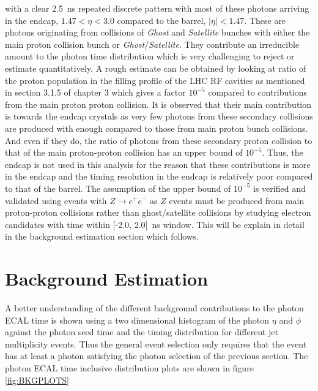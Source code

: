 with a clear 2.5~ns repeated discrete pattern with most of these photons arriving in the endcap, $ 1.47 < \eta < 3.0$ compared to the barrel, $|\eta| < 1.47$. These are photons originating from collisions of \textit{Ghost} and \textit{Satellite} bunches with either the main proton collision bunch or \textit{Ghost}/\textit{Satellite}. They contribute an irreducible amount to the photon time distribution which is very challenging to reject or estimate quantitatively. A rough estimate can be obtained by looking at ratio of the proton population in the filling profile of the LHC RF cavities as mentioned in section 3.1.5 of chapter 3 which gives a factor $10^{-5}$ compared to contributions from the main proton proton collision. It is observed that their main contribution is towards the endcap crystals as very few photons from these secondary collisions are produced with enough \pt compared to those from main proton bunch collisions. And even if they do, the ratio of photons from these secondary proton collision to that of the main proton-proton collision has an upper bound of  $10^{-5}$. 
Thus, the endcap is not used in this analysis for the reason that these contributions is more in the endcap and the timing resolution in the endcap is relatively poor compared to that of the barrel.
The assumption of the upper bound of $10^{-5}$ is verified and validated using events with $Z\rightarrow e^{+}e^{-}$ as $Z$ events must be produced from main proton-proton collisions rather than  ghost/satellite collisions by studying electron candidates with time within [-2.0, 2.0]~ns window. This will be explain in detail in the background estimation section which follows.


\section{Background Estimation}
A better understanding of the different background contributions to the photon ECAL time is shown using a two dimensional histogram of the photon $\eta$ and $\phi$ against the photon seed time and the timing distribution for different jet multiplicity events. Thus the general event selection only requires that the event has at least a photon satisfying the photon selection of the previous section.
The photon ECAL time inclusive distribution plots are shown in figure \ref{fig:BKGPLOTS}


